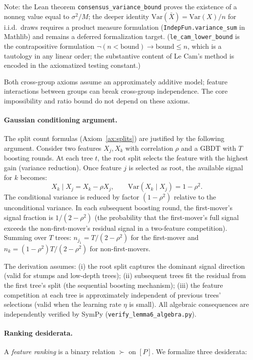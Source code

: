 \documentclass{article}
\newcommand{\Var}{\mathrm{Var}}
\begin{document}
Note: the Lean theorem \texttt{consensus\_variance\_bound} proves the existence of a nonneg value equal to $\sigma^2/M$; the deeper identity $\Var(\bar{X}) = \Var(X)/n$ for i.i.d.\ draws requires a product measure formulation (\texttt{IndepFun.variance\_sum} in Mathlib) and remains a deferred formalization target.
(\texttt{le\_cam\_lower\_bound} is the contrapositive formulation $\neg(n < \text{bound}) \to \text{bound} \leq n$, which is a tautology in any linear order; the substantive content of Le Cam's method is encoded in the axiomatized testing constant.)

Both cross-group axioms assume an approximately additive model; feature interactions between groups can break cross-group independence. The core impossibility and ratio bound do not depend on these axioms.

\paragraph{Gaussian conditioning argument.}
The split count formulas (Axiom~\ref{ax:splits}) are justified by the following argument. Consider two features $X_j, X_k$ with correlation $\rho$ and a GBDT with $T$ boosting rounds. At each tree $t$, the root split selects the feature with the highest gain (variance reduction). Once feature $j$ is selected as root, the available signal for $k$ becomes:
\[
  X_k \mid X_j = X_k - \rho X_j, \qquad \Var(X_k \mid X_j) = 1 - \rho^2.
\]
The conditional variance is reduced by factor $(1-\rho^2)$ relative to the unconditional variance. In each subsequent boosting round, the first-mover's signal fraction is $1/(2-\rho^2)$ (the probability that the first-mover's full signal exceeds the non-first-mover's residual signal in a two-feature competition). Summing over $T$ trees: $n_{j_1} = T/(2-\rho^2)$ for the first-mover and $n_k = (1-\rho^2)T/(2-\rho^2)$ for non-first-movers.

The derivation assumes: (i) the root split captures the dominant signal direction (valid for stumps and low-depth trees); (ii) subsequent trees fit the residual from the first tree's split (the sequential boosting mechanism); (iii) the feature competition at each tree is approximately independent of previous trees' selections (valid when the learning rate $\eta$ is small). All algebraic consequences are independently verified by SymPy (\texttt{verify\_lemma6\_algebra.py}).

\paragraph{Ranking desiderata.}
A \emph{feature ranking} is a binary relation $\succ$ on $[P]$.
We formalize three desiderata:
\end{document}

